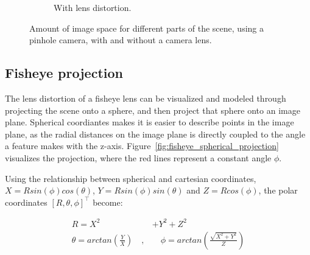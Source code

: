 \begin{figure}[!htb]
\begin{subfigure}[b]{0.45\textwidth}
    \caption{With lens distortion.}
    \label{fig:wide_angle_pinhole_lens}
    \end{subfigure}
    
    \caption{Amount of image space for different parts of the scene, using a pinhole camera, with and without a camera lens.}
    \label{fig:wide_angle_pinhole}
    
\end{figure}

\subsection{Fisheye projection}

The lens distortion of a fisheye lens can be visualized and modeled through projecting the scene onto a sphere, and then project that sphere onto an image plane. Spherical coordiantes makes it is easier to describe points in the image plane, as the radial distances on the image plane is directly coupled to the angle a feature makes with the z-axis. Figure~\ref{fig:fisheye_spherical_projection} visualizes the projection, where the red lines represent a constant angle $\phi$.

Using the relationship between spherical and cartesian coordinates, $X = Rsin(\phi)cos(\theta)$, $Y = Rsin(\phi)sin(\theta)$ and $Z = Rcos(\phi)$, the polar coordinates $[R,\theta,\phi]^\top$ become:

\begin{equation}
    \begin{aligned}
        R = X^2 &+ Y^2 + Z^2 \\
        \theta = arctan\left(\frac{Y}{X}\right)\quad  ,& \quad \phi = arctan\left(\frac{\sqrt{X^2 + Y^2}}{Z}\right)
    \end{aligned}
    \label{eq:theory_polar_coords}
\end{equation}

